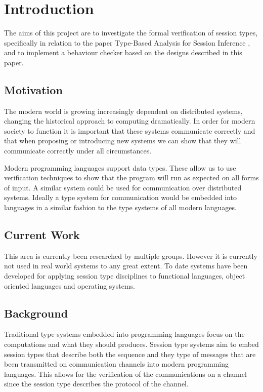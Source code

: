 \chapter{Introduction}

The aims of this project are to investigate the formal verification of session types, specifically in relation to the paper Type-Based Analysis for Session Inference \cite{paper1}, and to implement a behaviour checker based on the designs described in this paper.  

\section{Motivation}
The modern world is growing increasingly dependent on distributed systems, changing the historical approach to computing dramatically. In order for modern society to function it is important that these systems communicate correctly and that when proposing or introducing new systems we can show that they will communicate correctly under all circumstances. 

Modern programming languages support data types. These allow us to use verification techniques to show that the program will run as expected on all forms of input. A similar system could be used for communication over distributed systems. Ideally a type system for communication would be embedded into languages in a similar fashion to the type systems of all modern languages. 

\section{Current Work}
This area is currently been researched by multiple groups. However it is currently not used in real world systems to any great extent. To date systems have been developed for applying session type disciplines to functional languages, object oriented languages and operating systems. 

\section{Background}
Traditional type systems embedded into programming languages focus on the computations and what they should produces. Session type systems aim to embed session types that describe both the sequence and they type of messages that are been transmitted on communication channels into modern programming languages. This allows for the verification of the communications on a channel since the session type describes the protocol of the channel. 

